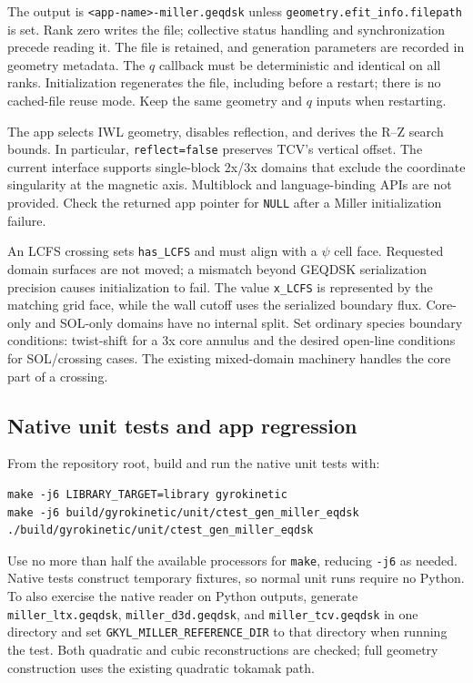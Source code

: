 \documentclass[11pt]{article}
\begin{document}
The output is \texttt{<app-name>-miller.geqdsk} unless
\texttt{geometry.efit\_info.filepath} is set. Rank zero writes the file;
collective status handling and synchronization precede reading it. The file
is retained, and generation parameters are recorded in geometry metadata.
The $q$ callback must be deterministic and identical on all ranks.
Initialization regenerates the file, including before a restart; there is no
cached-file reuse mode. Keep the same geometry and $q$ inputs when restarting.

The app selects IWL geometry, disables reflection, and derives the R--Z search
bounds. In particular, \texttt{reflect=false} preserves TCV's vertical offset.
The current interface supports single-block 2x/3x domains that exclude the
coordinate singularity at the magnetic axis. Multiblock and language-binding
APIs are not provided. Check the returned app pointer for \texttt{NULL} after
a Miller initialization failure.

An LCFS crossing sets \texttt{has\_LCFS} and must align with a $\psi$ cell face.
Requested domain surfaces are not moved; a mismatch beyond GEQDSK serialization
precision causes initialization to fail. The value \texttt{x\_LCFS} is represented
by the matching grid face, while the wall cutoff uses the serialized boundary
flux. Core-only and SOL-only domains have no internal split. Set ordinary
species boundary conditions: twist-shift for a 3x core annulus and the desired
open-line conditions for SOL/crossing cases. The existing mixed-domain
machinery handles the core part of a crossing.

\subsection{Native unit tests and app regression}
From the repository root, build and run the native unit tests with:
\begin{verbatim}
make -j6 LIBRARY_TARGET=library gyrokinetic
make -j6 build/gyrokinetic/unit/ctest_gen_miller_eqdsk
./build/gyrokinetic/unit/ctest_gen_miller_eqdsk
\end{verbatim}
Use no more than half the available processors for \texttt{make}, reducing
\texttt{-j6} as needed. Native tests construct temporary fixtures, so normal
unit runs require no Python. To also exercise the native reader on Python
outputs, generate \texttt{miller\_ltx.geqdsk}, \texttt{miller\_d3d.geqdsk}, and
\texttt{miller\_tcv.geqdsk} in one directory and set
\texttt{GKYL\_MILLER\_REFERENCE\_DIR} to that directory when running the test.
Both quadratic and cubic reconstructions are checked; full geometry
construction uses the existing quadratic tokamak path.
\end{document}
